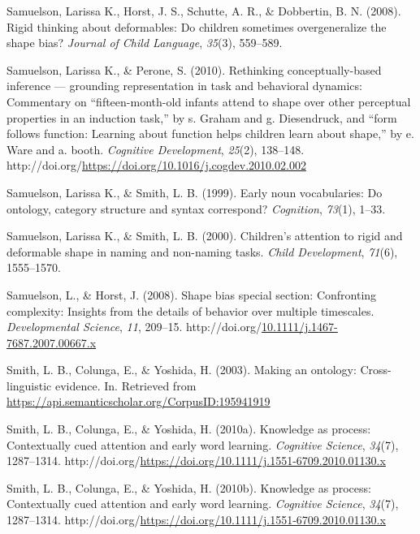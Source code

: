 \documentclass[10pt, letterpaper]{article}
\newenvironment{CSLReferences}%
  {}%
  {\par}
\begin{document}
\begin{CSLReferences}{1}{0}
\leavevmode{}%
Samuelson, Larissa K., Horst, J. S., Schutte, A. R., \& Dobbertin, B. N.
(2008). Rigid thinking about deformables: Do children sometimes
overgeneralize the shape bias? \emph{Journal of Child Language},
\emph{35}(3), 559--589.

\leavevmode{}%
Samuelson, Larissa K., \& Perone, S. (2010). Rethinking
conceptually-based inference --- grounding representation in task and
behavioral dynamics: Commentary on {``fifteen-month-old infants attend
to shape over other perceptual properties in an induction task,''} by s.
Graham and g. Diesendruck, and {``form follows function: Learning about
function helps children learn about shape,''} by e. Ware and a. booth.
\emph{Cognitive Development}, \emph{25}(2), 138--148.
http://doi.org/\url{https://doi.org/10.1016/j.cogdev.2010.02.002}

\leavevmode{}%
Samuelson, Larissa K., \& Smith, L. B. (1999). Early noun vocabularies:
Do ontology, category structure and syntax correspond? \emph{Cognition},
\emph{73}(1), 1--33.

\leavevmode{}%
Samuelson, Larissa K., \& Smith, L. B. (2000). Children's attention to
rigid and deformable shape in naming and non-naming tasks. \emph{Child
Development}, \emph{71}(6), 1555--1570.

\leavevmode{}%
Samuelson, L., \& Horst, J. (2008). Shape bias special section:
Confronting complexity: Insights from the details of behavior over
multiple timescales. \emph{Developmental Science}, \emph{11}, 209--15.
http://doi.org/\href{https://doi.org/10.1111/j.1467-7687.2007.00667.x}{10.1111/j.1467-7687.2007.00667.x}

\leavevmode{}%
Smith, L. B., Colunga, E., \& Yoshida, H. (2003). Making an ontology:
Cross-linguistic evidence. In. Retrieved from
\url{https://api.semanticscholar.org/CorpusID:195941919}

\leavevmode{}%
Smith, L. B., Colunga, E., \& Yoshida, H. (2010a). Knowledge as process:
Contextually cued attention and early word learning. \emph{Cognitive
Science}, \emph{34}(7), 1287--1314.
http://doi.org/\url{https://doi.org/10.1111/j.1551-6709.2010.01130.x}

\leavevmode{}%
Smith, L. B., Colunga, E., \& Yoshida, H. (2010b). Knowledge as process:
Contextually cued attention and early word learning. \emph{Cognitive
Science}, \emph{34}(7), 1287--1314.
http://doi.org/\url{https://doi.org/10.1111/j.1551-6709.2010.01130.x}


\end{CSLReferences}
\end{document}
